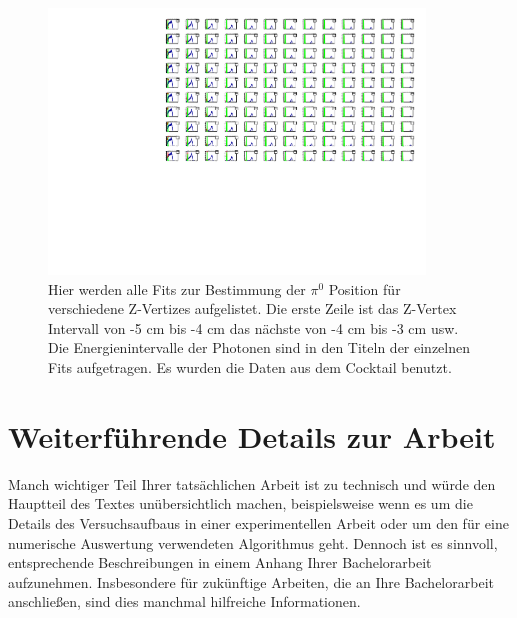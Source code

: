 \documentclass[a4paper,11pt,oneside,final,german,openbib,pdftex]{scrbook}
\begin{document}
\begin{appendix}
\begin{figure}
	\begin{center}
		\includegraphics[width=100mm]{FullZVertexDependenceAllFits}
		\caption{Hier werden alle Fits zur Bestimmung der $\pi^0$ Position  für verschiedene Z-Vertizes aufgelistet. Die erste Zeile ist das Z-Vertex Intervall von -5 cm bis -4 cm das nächste von -4 cm bis -3 cm usw. Die Energienintervalle der Photonen sind in den Titeln der einzelnen Fits aufgetragen. Es wurden die Daten aus dem Cocktail benutzt.}
		\label{fig:Z-Vertex-All-Fits}
	\end{center}
\end{figure}

\section{Weiterf\"uhrende Details zur Arbeit}

Manch wichtiger Teil Ihrer tats\"achlichen Arbeit ist zu technisch 
und w\"urde den Hauptteil des Textes un\"ubersichtlich machen, 
beispielsweise wenn es um die Details des Versuchsaufbaus in einer 
experimentellen Arbeit oder um den f\"ur eine numerische Auswertung 
verwendeten Algorithmus geht. Dennoch ist es sinnvoll, entsprechende 
Beschreibungen in einem Anhang Ihrer Bachelorarbeit aufzunehmen. 
Insbesondere f\"ur zuk\"unftige Arbeiten, die an Ihre Bachelorarbeit 
anschlie{\ss}en, sind dies manchmal hilfreiche Informationen.



\end{appendix}
\end{document}
